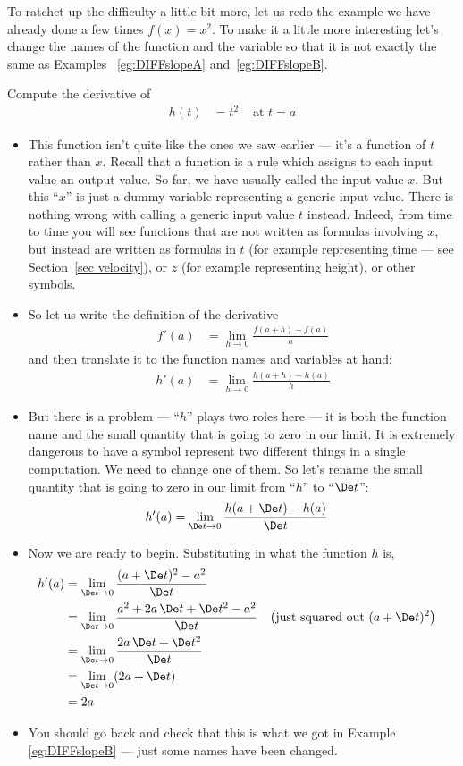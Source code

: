 To ratchet up the difficulty a little bit more, let us redo the example we have already
done a few times $f(x)=x^2$. To make it a little more interesting let's change the names
of the function and the variable so that it is not exactly the same as Examples~
\ref{eg:DIFFslopeA} and~\ref{eg:DIFFslopeB}.
\begin{eg}[Derivative of $h(t)=t^2$]\label{eg:DIFFderivX2}
Compute the derivative of
\begin{align*}
  h(t) &= t^2 & \text{ at $t=a$}
\end{align*}

\begin{itemize}
 \item This function isn't quite like the ones we saw earlier ---  it's
a function of $t$ rather than $x$. Recall that a function is a rule
which assigns to each input value an output value. So far, we have
usually called the input value $x$. But this ``$x$'' is just a dummy variable
representing a generic input value. There is nothing wrong with calling
a generic input value $t$ instead. Indeed, from time to time you will
see functions that are not written as formulas involving $x$, but instead
are written as formulas in  $t$ (for example representing
time --- see Section~\ref{sec velocity}), or $z$ (for example
representing height), or other symbols.

\item So let us write the definition of the derivative
\begin{align*}
  f'(a) &= \lim_{h \to 0} \frac{f(a+h)-f(a)}{h}
\end{align*}
and then translate it to the function names and variables at hand:
\begin{align*}
  h'(a) &= \lim_{h \to 0} \frac{h(a+h)-h(a)}{h}
\end{align*}
\item But there is a problem --- ``$h$'' plays two roles here --- it is both
the function name and the small quantity that is going to zero in our limit.
It is extremely dangerous to have a symbol represent two different things
in a single computation. We need to change one of them. So let's rename
the small quantity that is going to zero in our limit from ``$h$'' to
``$\De t$'':
\begin{align*}
  h'(a) &= \lim_{\De t \to 0} \frac{h(a+\De t)-h(a)}{\De t}
\end{align*}
\item Now we are ready to begin. Substituting in what the function $h$ is,
\begin{align*}
 h'(a) &= \lim_{\De t \to 0} \frac{(a+\De t)^2-a^2}{\De t}  \\
  &= \lim_{\De t \to 0} \frac{a^2+2a\,\De t+\De t^2-a^2}{\De t}
           && \big(\text{just squared out $(a+\De t)^2$}\big) \\
  &= \lim_{\De t \to 0} \frac{2a\,\De t+\De t^2}{\De t}  \\
  &= \lim_{\De t \to 0} (2a +\De t)  \\
  &= 2a
\end{align*}
\item You should go back and check that this is what we got in Example
\ref{eg:DIFFslopeB} --- just some names have been changed.


\end{itemize}
\end{eg}
